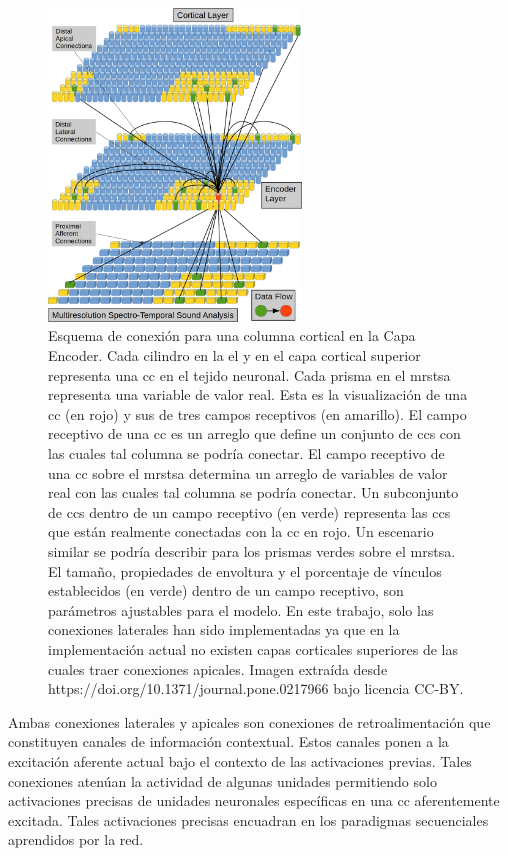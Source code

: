 {\begin{figure}[h!]
    \centering
    \includegraphics[width=0.6\textwidth]{EncoderColumnConnections.png}
    \caption{Esquema de conexión para una columna cortical en la Capa Encoder.
	    Cada cilindro en la \gls{el} y en el capa cortical superior representa una \gls{cc} en el tejido neuronal.
	    Cada prisma en el \gls{mrstsa} representa una variable de valor real.
	    Esta es la visualización de una \gls{cc} (en rojo) y sus de tres campos receptivos (en amarillo).
	    El campo receptivo de una \gls{cc} es un arreglo que define un conjunto de \glspl{cc}
	    con las cuales tal columna se podría conectar.
	    El campo receptivo de una \gls{cc} sobre el \gls{mrstsa} determina un arreglo de variables de valor real
	    con las cuales tal columna se podría conectar.
	    Un subconjunto de \glspl{cc} dentro de un campo receptivo (en verde) representa las \glspl{cc} que están realmente conectadas
	    con la \gls{cc} en rojo. Un escenario similar se podría describir para los prismas verdes sobre el \gls{mrstsa}.
	    El tamaño, propiedades de envoltura y el porcentaje de vínculos establecidos (en verde) dentro de un campo receptivo, son parámetros ajustables para el modelo.
	    En este trabajo, solo las conexiones laterales han sido implementadas ya que en la implementación actual no existen capas corticales superiores de las cuales traer conexiones apicales.
    Imagen extraída desde https://doi.org/10.1371/journal.pone.0217966 bajo licencia CC-BY.}
    \label{fig:EncoderColumnConnections}
\end{figure}

Ambas conexiones laterales y apicales son conexiones de retroalimentación que constituyen canales de información contextual.
Estos canales ponen a la excitación aferente actual bajo el contexto de las activaciones previas.
Tales conexiones atenúan la actividad de algunas unidades permitiendo solo activaciones precisas
de unidades neuronales específicas en una \gls{cc} aferentemente excitada.
Tales activaciones precisas encuadran en los paradigmas secuenciales aprendidos por la red.

}
